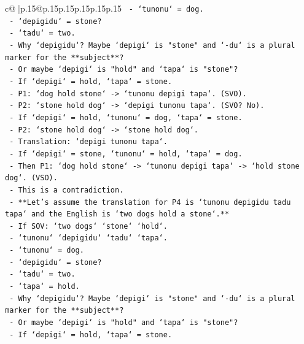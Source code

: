 \documentclass{article}
\begin{document}
{\begin{supertabular}{c@{$\;$}|p{.15\linewidth}@{}p{.15\linewidth}p{.15\linewidth}p{.15\linewidth}p{.15\linewidth}p{.15\linewidth}}
{{{\texttt{         {-} `tunonu` = dog.} \\
\texttt{         {-} `depigidu` = stone?} \\
\texttt{         {-} `tadu` = two.} \\
\texttt{         {-} Why `depigidu`? Maybe `depigi` is "stone" and `{-}du` is a plural marker for the **subject**?} \\
\texttt{         {-} Or maybe `depigi` is "hold" and `tapa` is "stone"?} \\
\texttt{           {-} If `depigi` = hold, `tapa` = stone.} \\
\texttt{           {-} P1: `dog hold stone` {-}> `tunonu depigi tapa`. (SVO).} \\
\texttt{           {-} P2: `stone hold dog` {-}> `depigi tunonu tapa`. (SVO? No).} \\
\texttt{           {-} If `depigi` = hold, `tunonu` = dog, `tapa` = stone.} \\
\texttt{           {-} P2: `stone hold dog` {-}> `stone hold dog`.} \\
\texttt{           {-} Translation: `depigi tunonu tapa`.} \\
\texttt{           {-} If `depigi` = stone, `tunonu` = hold, `tapa` = dog.} \\
\texttt{           {-} Then P1: `dog hold stone` {-}> `tunonu depigi tapa` {-}> `hold stone dog`. (VSO).} \\
\texttt{           {-} This is a contradiction.} \\
\texttt{     {-} **Let's assume the translation for P4 is `tunonu depigidu tadu tapa` and the English is `two dogs hold a stone`.**} \\
\texttt{       {-} If SOV: `two dogs` `stone` `hold`.} \\
\texttt{       {-} `tunonu` `depigidu` `tadu` `tapa`.} \\
\texttt{       {-} `tunonu` = dog.} \\
\texttt{       {-} `depigidu` = stone?} \\
\texttt{       {-} `tadu` = two.} \\
\texttt{       {-} `tapa` = hold.} \\
\texttt{       {-} Why `depigidu`? Maybe `depigi` is "stone" and `{-}du` is a plural marker for the **subject**?} \\
\texttt{       {-} Or maybe `depigi` is "hold" and `tapa` is "stone"?} \\
\texttt{         {-} If `depigi` = hold, `tapa` = stone.} \\
}}}
\end{supertabular}}
\end{document}
